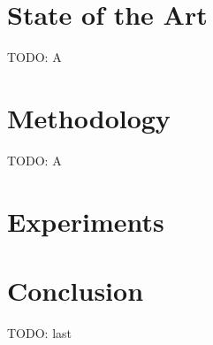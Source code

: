 \documentclass{IOS-Book-Article}
\theoremstyle{definition}
\begin{document}
\section{State of the Art}
\label{sec:sota}

TODO: A



\section{Methodology}
\label{sec:method}

TODO: A



\section{Experiments}
\label{sec:experiments}



\section{Conclusion}

TODO: last





\end{document}
